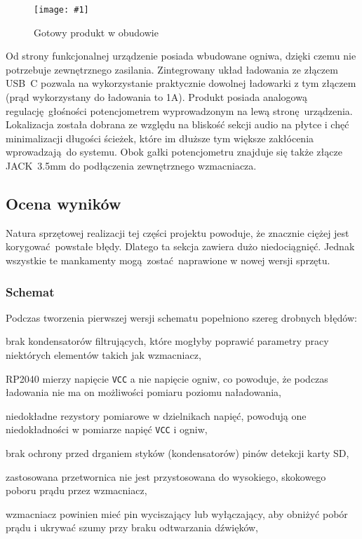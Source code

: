 \documentclass[polish]{aghengthesis}
\let\tempone\itemize
\let\temptwo\enditemize
\renewenvironment{itemize}{\tempone\setlength{\itemsep}{0cm}}{\temptwo}
\newcommand{\imgint}[4]{
	\begin{figure}[{#4}]
		\centering
		\texttt{[image: \#1]}
		\caption{#2}
		\label{#1}
	\end{figure}
}
\newcommand{\imgh}[3]{\imgint{#1}{#2}{#3}{H}}
\begin{document}
		\imgh{5/hw_result}{Gotowy produkt w obudowie}{0.7}
		
		Od strony funkcjonalnej urządzenie posiada wbudowane ogniwa, dzięki czemu nie potrzebuje zewnętrznego zasilania. Zintegrowany układ ładowania ze złączem USB~C pozwala na wykorzystanie praktycznie dowolnej ładowarki z tym złączem (prąd wykorzystany do ładowania to 1A). Produkt posiada analogową regulację głośności potencjometrem wyprowadzonym na lewą stronę urządzenia. Lokalizacja została dobrana ze względu na bliskość sekcji audio na płytce i chęć minimalizacji długości ścieżek, które im dłuższe tym większe zakłócenia wprowadzają do systemu. Obok gałki potencjometru znajduje się także złącze JACK~3.5mm do podłączenia zewnętrznego wzmacniacza.
		
		\subsection{Ocena wyników}
			Natura sprzętowej realizacji tej części projektu powoduje, że znacznie ciężej jest korygować powstałe błędy. Dlatego ta sekcja zawiera dużo niedociągnięć. Jednak wszystkie te mankamenty mogą zostać naprawione w nowej wersji sprzętu.
			
			\subsubsection{Schemat}
				\noindent
				Podczas tworzenia pierwszej wersji schematu popełniono szereg drobnych błędów:
				\begin{itemize}
					\item brak kondensatorów filtrujących, które mogłyby poprawić parametry pracy niektórych elementów takich jak wzmacniacz,
					\item RP2040 mierzy napięcie \lstinline|VCC| a nie napięcie ogniw, co powoduje, że podczas ładowania nie ma on możliwości pomiaru poziomu naładowania,
					\item niedokładne rezystory pomiarowe w dzielnikach napięć, powodują one niedokładności w pomiarze napięć \lstinline|VCC| i ogniw,
					\item brak ochrony przed drganiem styków (kondensatorów) pinów detekcji karty SD,
					\item zastosowana przetwornica nie jest przystosowana do wysokiego, skokowego poboru prądu przez wzmacniacz,
					\item wzmacniacz powinien mieć pin wyciszający lub wyłączający, aby obniżyć pobór prądu i ukrywać szumy przy braku odtwarzania dźwięków,
				\end{itemize}
				
\end{document}
